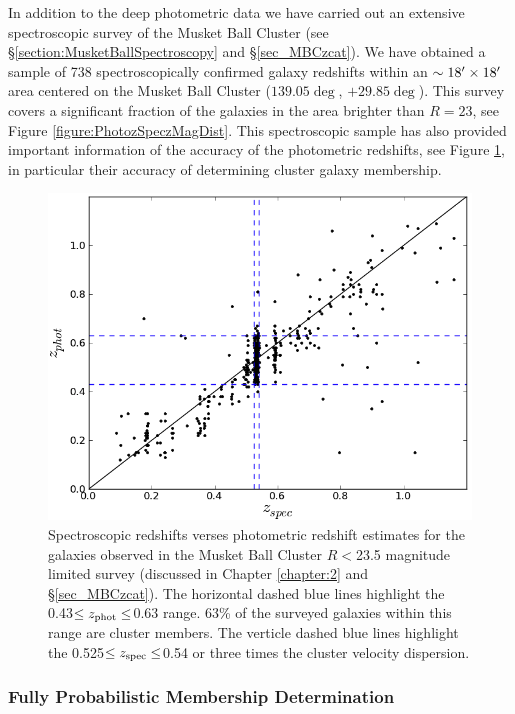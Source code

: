 In addition to the deep photometric data we have carried out an extensive spectroscopic survey of the Musket Ball Cluster (see \S\ref{section:MusketBallSpectroscopy} and \S\ref{sec_MBCzcat}).
We have obtained a sample of 738 spectroscopically confirmed galaxy redshifts within an $\sim 18\mbox{$^\prime$} \times 18\mbox{$^\prime$}$ area centered on the Musket Ball Cluster ($139.05\deg$, $+29.85\deg$).
This survey covers a significant fraction of the galaxies in the area brighter than $R=23$, see Figure \ref{figure:PhotozSpeczMagDist}.
This spectroscopic sample has also provided important information of the accuracy of the photometric redshifts, see Figure \ref{figure:photzVSspecz}, in particular their accuracy of determining cluster galaxy membership.

\begin{figure}
\centering
\includegraphics[width=5in]{Chapter4/photVSspec.png}
\caption[Spectroscopic verses photometric redshift for the Musket Ball Cluster.]{
Spectroscopic redshifts verses photometric redshift estimates for the galaxies observed in the Musket Ball Cluster $R<$23.5 magnitude limited survey (discussed in Chapter \ref{chapter:2} and \S\ref{sec_MBCzcat}).
The horizontal dashed blue lines highlight the 0.43$\leq z_{\rm phot} \leq$0.63 range.
63\% of the surveyed galaxies within this range are cluster members.
The verticle dashed blue lines highlight the 0.525$\leq z_{\rm spec} \leq$0.54 or three times the cluster velocity dispersion.
}
\label{figure:photzVSspecz}
\end{figure}


\subsubsection{Fully Probabilistic Membership Determination}

